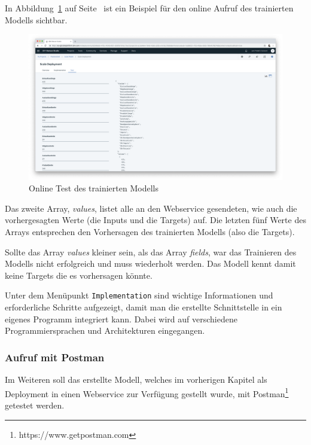 In Abbildung~\ref{fig:umsetzung_deployment_test} auf Seite~\pageref{fig:umsetzung_deployment_test} ist ein Beispiel für
den online Aufruf des trainierten Modells sichtbar.

\begin{figure}[h]
    \centering
    \includegraphics[width=\textwidth]{images/kapitel_3/deployment_test.png}
    \caption{Online Test des trainierten Modells}
    \label{fig:umsetzung_deployment_test}
\end{figure}

Das zweite Array, \textit{values}, listet alle an den Webservice gesendeten, wie auch die vorhergesagten Werte (die
Inputs und die Targets) auf. Die letzten fünf Werte des Arrays entsprechen den Vorhersagen des trainierten Modells (also
die Targets).

Sollte das Array \textit{values} kleiner sein, als das Array \textit{fields}, war das Trainieren des Modells nicht
erfolgreich und muss wiederholt werden. Das Modell kennt damit keine Targets die es vorhersagen könnte.

Unter dem Menüpunkt \texttt{Implementation} sind wichtige Informationen und erforderliche Schritte aufgezeigt, damit
man die erstellte Schnittstelle in ein eigenes Programm integriert kann. Dabei wird auf verschiedene Programmiersprachen
und Architekturen eingegangen.

\subsubsection{Aufruf mit Postman}
\label{subsec:Aufruf mit Postman}
Im Weiteren soll das erstellte Modell, welches im vorherigen Kapitel als Deployment in einen Webservice zur Verfügung
gestellt wurde, mit Postman\footnote{https://www.getpostman.com} getestet werden.

